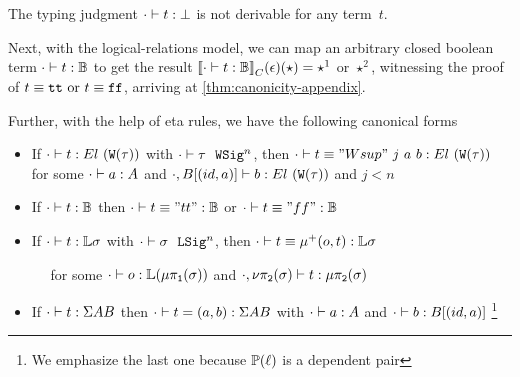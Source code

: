\begin{theorem}[Consistency]
  The typing judgment $ {\cdot} \vdash {t} : {\bot} $ is not derivable for any term~$t$.
\end{theorem}

Next, with the logical-relations model, we can map an arbitrary closed boolean
term $ {\cdot} \vdash {t} : {\mathbb{B}} $ to get the result
${\llbracket {\ensuremath{ {\cdot} \vdash {t} : {\mathbb{B}} }} \rrbracket}_C(\epsilon)(\star) = \star^1$ or $\star^2$,
witnessing the proof of $t \equiv \texttt{tt} \text{ or } t \equiv\texttt{ff}$, arriving at
\cref{thm:canonicity-appendix}.


Further, with the help of eta rules, we have the following canonical forms
\begin{theorem}\hfill
  \begin{itemize}
    \item If $ {\cdot} \vdash {t} : {El~(\texttt{W}({\tau}))} $ with $ {\cdot} \vdash {\tau} \ \ \texttt{WSig}^{n} $, then $ {\cdot} \vdash {t \equiv "Wsup"~j~a~b} : {El~(\texttt{W}({\tau}))} $ for some $ {\cdot} \vdash {a} : {A} $ and $ {\cdot, B[(id, a)]} \vdash {b} : {El~(\texttt{W}({\tau}))} $ and $j < n$
    \item If $ {\cdot} \vdash {t} : {\mathbb{B}} $ then $ {\cdot} \vdash {t \equiv "tt"} : {\mathbb{B}} $ or $ {\cdot} \vdash {t \equiv "ff"} : {\mathbb{B}} $ 
    \item If $ {\cdot} \vdash {t} : {\mathbb{L}\sigma} $ with $ {\cdot} \vdash {\sigma} \ \ \texttt{LSig}^{n} $, then $ {\cdot} \vdash {t \equiv \ensuremath{\mu^+({o},{t})}} : {\mathbb{L}\sigma} $ 
    
      $\quad$ for some $ {\cdot} \vdash {o} : {\mathbb{L}(\mu\pi_{\texttt{1}}({\sigma}))} $ and $ {\cdot, \nu\pi_{\texttt{2}}({\sigma})} \vdash {t} : {\mu\pi_{\texttt{2}}({\sigma})} $
    \item If $ {\cdot} \vdash {t} : {\Sigma A B} $ then $ {\cdot} \vdash {t = (a, b)} : {\Sigma A B} $ with $ {\cdot} \vdash {a} : {A} $ and $ {\cdot} \vdash {b} : {B[(id, a)]} $
    \footnote{We emphasize the last one because $\mathbb{P}({\ell})$ is a dependent pair}
  \end{itemize}
\end{theorem}

